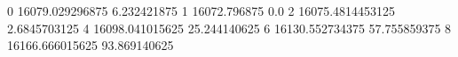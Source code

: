 0 16079.029296875 6.232421875
1 16072.796875 0.0
2 16075.4814453125 2.6845703125
4 16098.041015625 25.244140625
6 16130.552734375 57.755859375
8 16166.666015625 93.869140625
